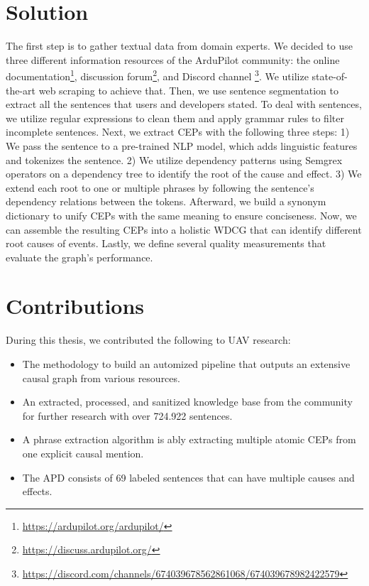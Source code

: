 \section{Solution}\label{sec:solution}
The first step is to gather textual data from domain experts.
We decided to use three different information resources of the ArduPilot community: the online documentation\footnote{\url{https://ardupilot.org/ardupilot/}}, discussion forum\footnote{\url{https://discuss.ardupilot.org/}}, and Discord channel \footnote{\url{https://discord.com/channels/674039678562861068/674039678982422579}}.
We utilize state-of-the-art web scraping to achieve that.
Then, we use sentence segmentation to extract all the sentences that users and developers stated.
To deal with  sentences, we utilize regular expressions to clean them and apply grammar rules to filter incomplete sentences.
Next, we extract \ac{CEP}s with the following three steps: 1) We pass the sentence to a pre-trained \ac{NLP} model, which adds linguistic features and tokenizes the sentence.
2) We utilize dependency patterns using Semgrex operators on a dependency tree to identify the root of the cause and effect.
3) We extend each root to one or multiple phrases by following the sentence's dependency relations between the tokens.
Afterward, we build a synonym dictionary to unify \ac{CEP}s with the same meaning to ensure conciseness.
Now, we can assemble the resulting \ac{CEP}s into a holistic \ac{WDCG} that can identify different root causes of events.
Lastly, we define several quality measurements that evaluate the graph’s performance.


\section{Contributions}\label{sec:contributions}
During this thesis, we contributed the following to \ac{UAV} research:
\begin{itemize}
    \item The methodology to build an automized pipeline that outputs an extensive causal graph from various resources.
    \item An extracted, processed, and sanitized knowledge base from the community for further research with over 724.922 sentences.
    \item A phrase extraction algorithm is ably extracting multiple atomic \ac{CEP}s from one explicit causal mention.
    \item The \ac{APD} consists of 69 labeled sentences that can have multiple causes and effects.
\end{itemize}



